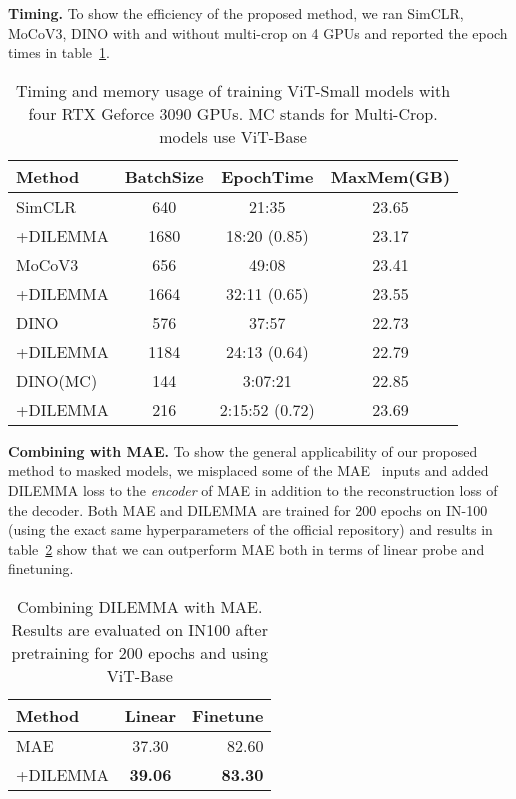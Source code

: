\documentclass[letterpaper]{article} \usepackage{aaai23}  \usepackage{times}  \usepackage{helvet}  \usepackage{courier}  \usepackage[hyphens]{url}  \usepackage{graphicx} \urlstyle{rm} \def\UrlFont{\rm}  \usepackage{natbib}  \usepackage{caption} \frenchspacing  \setlength{\pdfpagewidth}{8.5in}  \setlength{\pdfpageheight}{11in}  \usepackage{algorithm}
\newcommand{\methodname}{DILEMMA}
\begin{document}
\noindent\textbf{Timing.}
To show the efficiency of the proposed method, we ran SimCLR, MoCoV3, DINO with and without multi-crop on 4 GPUs and reported the epoch times in table~\ref{tab:timing}.\\

\begin{table}[t]
    \centering
    \centering
    \begin{adjustbox}{width=\columnwidth}
    \begin{tabular}{lccc}
    \toprule
    Method & BatchSize & EpochTime & MaxMem(GB)\\
    \midrule
    SimCLR & 640 & 21:35 & 23.65\\
    +\methodname & 1680 & 18:20 (0.85) & 23.17\\
    MoCoV3 & 656 & 49:08 & 23.41\\
    +\methodname & 1664 & 32:11 (0.65) & 23.55\\
    DINO & 576 & 37:57 & 22.73\\
    +\methodname & 1184 & 24:13 (0.64) & 22.79\\
    DINO(MC) & 144 & 3:07:21 & 22.85\\
    +\methodname & 216 & 2:15:52 (0.72) & 23.69\\
    \bottomrule
    \end{tabular}
    \end{adjustbox}
    \caption{Timing and memory usage of training ViT-Small models with four RTX Geforce 3090 GPUs. MC stands for Multi-Crop.  models use ViT-Base}
    \label{tab:timing}
\end{table}

\noindent\textbf{Combining with MAE.}
To show the general applicability of our proposed method to masked models, we misplaced some of the MAE~\cite{he2021masked} inputs and added {\methodname} loss to the \emph{encoder} of MAE in addition to the reconstruction loss of the decoder. Both MAE and {\methodname} are trained for 200 epochs on IN-100 (using the exact same hyperparameters of the official repository) and  results in table~\ref{tab:mae} show that we can outperform MAE both in terms of linear probe and finetuning.\\

\begin{table}[t]
\centering
    \small
\begin{tabular*}{\linewidth}{@{}l@{\extracolsep{\fill}}cr@{}}
\toprule
Method & Linear & Finetune\\
\hline
MAE & 37.30 & 82.60\\
+\methodname & \bf 39.06 & \bf 83.30\\
\bottomrule
\end{tabular*}
\caption{Combining {\methodname} with MAE. Results are evaluated on IN100 after pretraining for 200 epochs and using ViT-Base}
\label{tab:mae}
\end{table}
\end{document}
